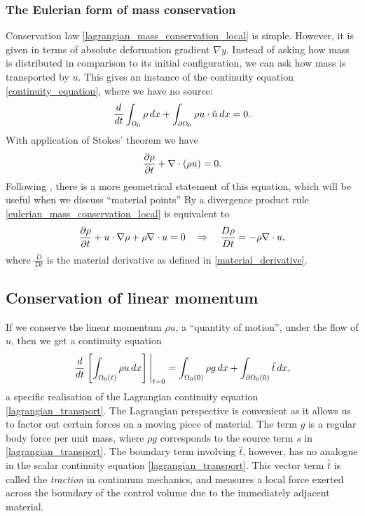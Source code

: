 \subsubsection{The Eulerian form of mass conservation}
Conservation law \eqref{lagrangian_mass_conservation_local} is simple. However, it is given in terms of absolute deformation gradient $\nabla y$.
Instead of asking how mass is distributed
in comparison to its initial configuration, we can ask how mass is transported by $u$.
This gives an instance of the continuity equation \eqref{continuity_equation}, where we have no source:
\begin{equation}\label{eulerian_mass_conservation}
    \frac{d}{dt} \int_{{\Omega_0}} \rho \,dx + \int_{{\partial\Omega_0}} \rho u\cdot \hat{n}\,dx = 0.
\end{equation}
With application of Stokes' theorem we have
\begin{equation}\label{eulerian_mass_conservation_local}
    \frac{\partial \rho}{\partial t} + \nabla \cdot (\rho u) = 0.
\end{equation}
Following \cite{leal}, there is a more geometrical statement of this equation, which will be useful when
we discuss ``material points''
By a divergence product rule \eqref{eulerian_mass_conservation_local} is equivalent to
\begin{equation}\label{eulerian_mass_conservation_local_material}
    \frac{\partial \rho}{\partial t} + u\cdot\nabla\rho + \rho\nabla\cdot u = 0
    \quad\Rightarrow\quad \frac{D\rho}{Dt} = -\rho\nabla\cdot u,
\end{equation}
where $\frac{D}{Dt}$ is the material derivative as defined in \eqref{material_derivative}.

\subsection{Conservation of linear momentum}
If we conserve the linear momentum $\rho u$, a ``quantity of motion'', under the flow of $u$, then we get a continuity equation
\begin{equation}\label{cauchy_continuity_traction}
    \eval{\frac{d}{dt}\left[\int_{\Omega_0(t)}\rho u\,dx\right]}_{t=0} = \int_{\omn(0)} \rho g\,dx + \int_{\pomn(0)}\hat{t}\,dx,
\end{equation}
a specific realisation of the Lagrangian continuity equation \eqref{lagrangian_transport}. The Lagrangian perspective is convenient
as it allows us to factor out certain forces on a moving piece of material. The term $g$ is a regular body force per unit mass, where $\rho g$ corresponds to
the source term $s$ in \eqref{lagrangian_transport}. The boundary term involving $\hat{t}$, however, has no analogue in the scalar continuity equation
\eqref{lagrangian_transport}.
This vector term $\hat{t}$ is called the \textit{traction} in continuum mechanics, and measures a local force exerted across the boundary
of the control volume due to the immediately adjacent material.

